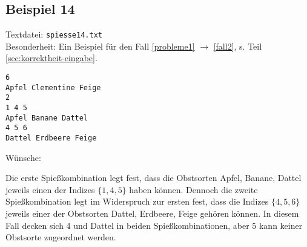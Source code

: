 \subsection{Beispiel 14}\label{example:14}
Textdatei: \texttt{spiesse14.txt}\\
Besonderheit: Ein Beispiel für den Fall \ref{probleme1} $\rightarrow$ \ref{fall2}, s. Teil \ref{sec:korrektheit-eingabe}.
\begin{verbatim}
6
Apfel Clementine Feige
2
1 4 5
Apfel Banane Dattel
4 5 6
Dattel Erdbeere Feige
\end{verbatim}

\noindent
Wünsche: 
\vspace{0.25cm}

\noindent
{}
\vspace{0.25cm}

Die erste Spießkombination legt fest, dass die Obstsorten Apfel, Banane, Dattel
jeweils einen der Indizes $\{1, 4, 5\}$ haben können. Dennoch die zweite Spießkombination 
legt im Widerspruch zur ersten fest, dass die Indizes $\{4, 5, 6\}$ jeweils einer der
Obstsorten Dattel, Erdbeere, Feige gehören können. In diesem Fall decken sich 4 und Dattel
in beiden Spießkombinationen, aber 5 kann keiner Obstsorte zugeordnet werden.